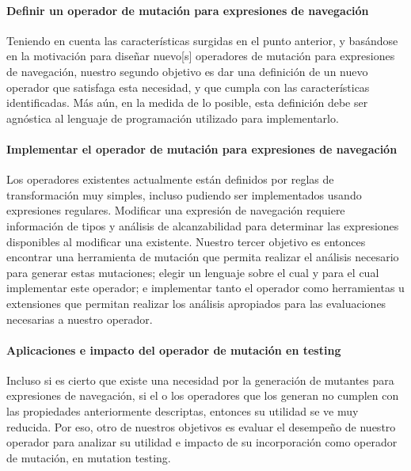\paragraph{Definir un operador de mutaci\'on para expresiones de navegaci\'on}
Teniendo en cuenta las caracter\'isticas surgidas en el punto anterior, y bas\'andose en la motivaci\'on para dise\~nar nuevo[s] operadores de mutaci\'on para expresiones de navegaci\'on, nuestro segundo objetivo es dar una definici\'on de un nuevo operador que satisfaga esta necesidad, y que cumpla con las caracter\'isticas identificadas. M\'as a\'un, en la medida de lo posible, esta definici\'on debe ser agn\'ostica al lenguaje de programaci\'on utilizado para implementarlo.

\paragraph{Implementar el operador de mutaci\'on para expresiones de navegaci\'on}
Los operadores existentes actualmente est\'an definidos por reglas de transformaci\'on muy simples, incluso pudiendo ser implementados usando expresiones regulares. Modificar una expresi\'on de navegaci\'on requiere informaci\'on de tipos y an\'alisis de alcanzabilidad para determinar las expresiones disponibles al modificar una existente. Nuestro tercer objetivo es entonces encontrar una herramienta de mutaci\'on que permita realizar el an\'alisis necesario para generar estas mutaciones; elegir un lenguaje sobre el cual y para el cual implementar este operador; e implementar tanto el operador como herramientas u extensiones que permitan realizar los an\'alisis apropiados para las evaluaciones necesarias a nuestro operador.

\paragraph{Aplicaciones e impacto del operador de mutaci\'on en testing}
Incluso si es cierto que existe una necesidad por la generaci\'on de mutantes para expresiones de navegaci\'on, si el o los operadores que los generan no cumplen con las propiedades anteriormente descriptas, entonces su utilidad se ve muy reducida. Por eso, otro de nuestros objetivos es evaluar el desempe\~no de nuestro operador para analizar su utilidad e impacto de su incorporaci\'on como operador de mutaci\'on, en mutation testing.

